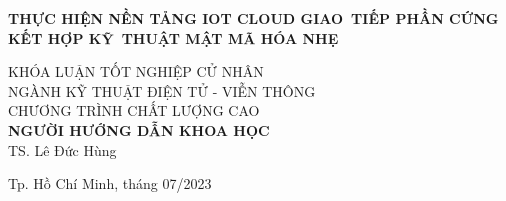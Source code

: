 \begin{titlepage}
\begin{center}

{ \Large \bfseries THỰC HIỆN NỀN TẢNG IOT CLOUD GIAO~TIẾP PHẦN CỨNG KẾT HỢP KỸ~THUẬT MẬT MÃ HÓA NHẸ\\[2cm] } 


\large KHÓA LUẬN TỐT NGHIỆP CỬ NHÂN\\
\large NGÀNH KỸ THUẬT ĐIỆN TỬ - VIỄN THÔNG\\
\large CHƯƠNG TRÌNH CHẤT LƯỢNG CAO\\[2cm]

\textbf{NGƯỜI HƯỚNG DẪN KHOA HỌC}\\
TS. Lê Đức Hùng


\vfill
Tp. Hồ Chí Minh, tháng 07/2023

\end{center}
\thispagestyle{empty}
\end{titlepage}
\hypersetup{pageanchor=true}